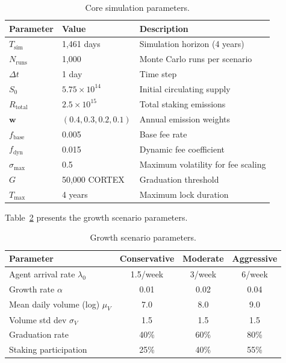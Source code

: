 \begin{table}[H]
\centering
\caption{Core simulation parameters.}
\label{tab:sim-core}
\begin{tabular}{@{}lll@{}}
\toprule
\textbf{Parameter} & \textbf{Value} & \textbf{Description} \\
\midrule
$T_{\text{sim}}$ & 1{,}461 days & Simulation horizon (4 years) \\
$N_{\text{runs}}$ & 1{,}000 & Monte Carlo runs per scenario \\
$\Delta t$ & 1 day & Time step \\
$S_0$ & $5.75 \times 10^{14}$ & Initial circulating supply \\
$R_{\text{total}}$ & $2.5 \times 10^{15}$ & Total staking emissions \\
$\mathbf{w}$ & $(0.4, 0.3, 0.2, 0.1)$ & Annual emission weights \\
$f_{\text{base}}$ & 0.005 & Base fee rate \\
$f_{\text{dyn}}$ & 0.015 & Dynamic fee coefficient \\
$\sigma_{\max}$ & 0.5 & Maximum volatility for fee scaling \\
$G$ & 50{,}000 CORTEX & Graduation threshold \\
$T_{\max}$ & 4 years & Maximum lock duration \\
\bottomrule
\end{tabular}
\end{table}

Table~\ref{tab:sim-growth} presents the growth scenario parameters.

\begin{table}[H]
\centering
\caption{Growth scenario parameters.}
\label{tab:sim-growth}
\begin{tabular}{@{}lccc@{}}
\toprule
\textbf{Parameter} & \textbf{Conservative} & \textbf{Moderate} & \textbf{Aggressive} \\
\midrule
Agent arrival rate $\lambda_0$ & 1.5/week & 3/week & 6/week \\
Growth rate $\alpha$ & 0.01 & 0.02 & 0.04 \\
Mean daily volume (log) $\mu_V$ & 7.0 & 8.0 & 9.0 \\
Volume std dev $\sigma_V$ & 1.5 & 1.5 & 1.5 \\
Graduation rate & 40\% & 60\% & 80\% \\
Staking participation & 25\% & 40\% & 55\% \\
\bottomrule
\end{tabular}
\end{table}

